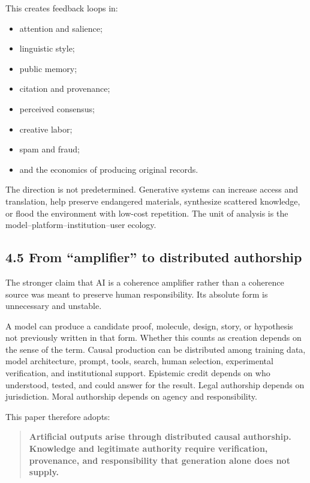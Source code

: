 \documentclass[
  11pt,
]{article}
\providecommand{\tightlist}{%
  \setlength{\itemsep}{0pt}\setlength{\parskip}{0pt}}
\begin{document}
This creates feedback loops in:

\begin{itemize}
\tightlist
\item
  attention and salience;
\item
  linguistic style;
\item
  public memory;
\item
  citation and provenance;
\item
  perceived consensus;
\item
  creative labor;
\item
  spam and fraud;
\item
  and the economics of producing original records.
\end{itemize}

The direction is not predetermined. Generative systems can increase
access and translation, help preserve endangered materials, synthesize
scattered knowledge, or flood the environment with low-cost repetition.
The unit of analysis is the model--platform--institution--user ecology.

\subsection{4.5 From ``amplifier'' to distributed
authorship}\label{from-amplifier-to-distributed-authorship}

The stronger claim that AI is a coherence amplifier rather than a
coherence source was meant to preserve human responsibility. Its
absolute form is unnecessary and unstable.

A model can produce a candidate proof, molecule, design, story, or
hypothesis not previously written in that form. Whether this counts as
creation depends on the sense of the term. Causal production can be
distributed among training data, model architecture, prompt, tools,
search, human selection, experimental verification, and institutional
support. Epistemic credit depends on who understood, tested, and could
answer for the result. Legal authorship depends on jurisdiction. Moral
authorship depends on agency and responsibility.

This paper therefore adopts:

\begin{quote}
\textbf{Artificial outputs arise through distributed causal authorship.
Knowledge and legitimate authority require verification, provenance, and
responsibility that generation alone does not supply.}
\end{quote}
\end{document}
